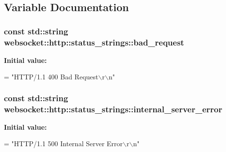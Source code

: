 \subsection{Variable Documentation}
\subsubsection[{\texorpdfstring{bad\+\_\+request}{bad_request}}]{\setlength{\rightskip}{0pt plus 5cm}const std\+::string websocket\+::http\+::status\+\_\+strings\+::bad\+\_\+request}\hypertarget{namespacewebsocket_1_1http_1_1status__strings_a29073784a5e6444e93b0925153605222}{}\label{namespacewebsocket_1_1http_1_1status__strings_a29073784a5e6444e93b0925153605222}
{\bfseries Initial value\+:}
\begin{DoxyCode}
=
                \textcolor{stringliteral}{"HTTP/1.1 400 Bad Request\(\backslash\)r\(\backslash\)n"}
\end{DoxyCode}
\subsubsection[{\texorpdfstring{internal\+\_\+server\+\_\+error}{internal_server_error}}]{\setlength{\rightskip}{0pt plus 5cm}const std\+::string websocket\+::http\+::status\+\_\+strings\+::internal\+\_\+server\+\_\+error}\hypertarget{namespacewebsocket_1_1http_1_1status__strings_a364b430d5e52bc7600da0bcc5dc0d5fc}{}\label{namespacewebsocket_1_1http_1_1status__strings_a364b430d5e52bc7600da0bcc5dc0d5fc}
{\bfseries Initial value\+:}
\begin{DoxyCode}
=
                \textcolor{stringliteral}{"HTTP/1.1 500 Internal Server Error\(\backslash\)r\(\backslash\)n"}
\end{DoxyCode}
